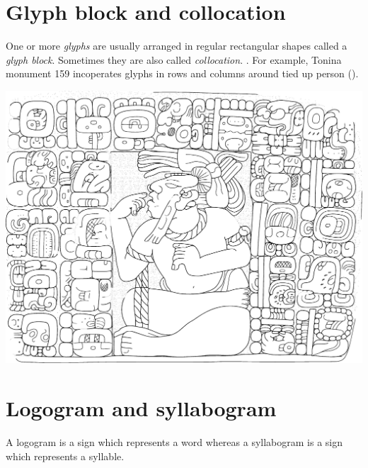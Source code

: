 \documentclass[../main.tex]{subfiles}
\begin{document}
\section{Glyph block and collocation}
One or more \emph{glyphs} are usually arranged in regular rectangular shapes called a 
\emph{glyph block}.
Sometimes they are also called \emph{collocation}.
.
For example, Tonina monument 159 incoperates glyphs in rows and columns around tied up person 
().
\begin{center}
    \includegraphics[width=\textwidth,keepaspectratio]{img/tonina-monument-159}
    \label{fig:terminology-glyphs-in-rows-and-columns}
\end{center}

\section{Logogram and syllabogram}
A logogram is a sign which represents a word whereas a syllabogram is a sign which 
represents a syllable.
\end{document}
